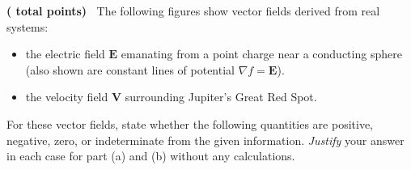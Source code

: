 \documentclass[12pt]{exam}
\newcommand{\vV}{\mathbf{V}}
\newcommand{\vB}{\mathbf{B}}
\newcommand{\vE}{\mathbf{E}}
\newcommand{\vD}{\mathbf{D}}
\newcommand{\vA}{\mathbf{A}}
\begin{document}

\begin{questions}


\question
\textbf{( total points)} $\ $
The following figures show vector fields derived from real
		systems:
	\begin{itemize}
		\item the electric field $\vE$ emanating from a
		point charge near a conducting sphere (also shown are constant
		lines of potential $\nabla f = \vE$).
		\item the velocity field $\vV$ surrounding Jupiter's Great Red Spot.
	\end{itemize}
	For these vector fields, state whether the following quantities are positive, negative, zero, or indeterminate from the given information.
 \textit{Justify} your answer in each case for part (a) and (b) without any calculations.
\end{questions}
\end{document}
